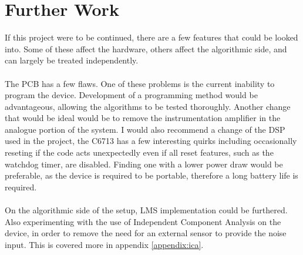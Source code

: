 \section{Further Work}

If this project were to be continued, there are a few features that could be looked into.
Some of these affect the hardware, others affect the algorithmic side, and can largely be treated independently.
\\
\\
The PCB has a few flaws.
One of these problems is the current inability to program the device.
Development of a programming method would be advantageous, allowing the algorithms to be tested thoroughly.
Another change that would be ideal would be to remove the instrumentation amplifier in the analogue portion of the system.
I would also recommend a change of the DSP used in the project, the C6713 has a few interesting quirks including occasionally reseting if the code acts unexpectedly even if all reset features, such as the watchdog timer, are disabled.
Finding one with a lower power draw would be preferable, as the device is required to be portable, therefore a long battery life is required.
\\
\\
On the algorithmic side of the setup, LMS implementation could be furthered.
Also experimenting with the use of Independent Component Analysis on the device, in order to remove the need for an external sensor to provide the noise input.
This is covered more in appendix \ref{appendix:ica}.
